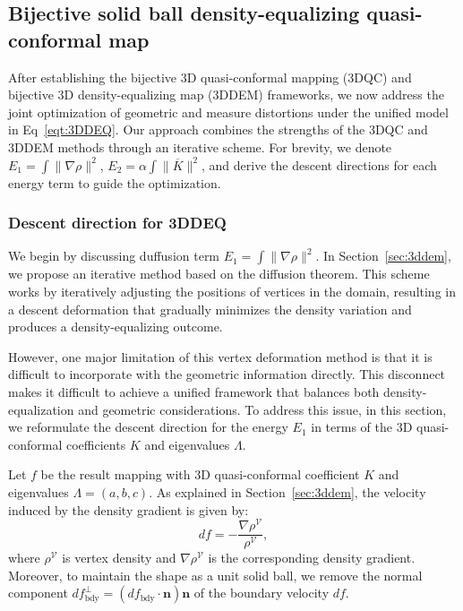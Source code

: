 \documentclass{article}
\begin{document}
\subsection{Bijective solid ball density-equalizing quasi-conformal map}
After establishing the bijective 3D quasi-conformal mapping (3DQC) and bijective 3D density-equalizing map (3DDEM) frameworks, we now address the joint optimization of geometric and measure distortions under the unified model in Eq~\eqref{eqt:3DDEQ}. Our approach combines the strengths of the 3DQC and 3DDEM methods through an iterative scheme. For brevity, we denote $E_1 = \int \|\nabla \rho \|^2$, $E_2 = \alpha \int \|\overline{K} \|^2$, and derive the descent directions for each energy term to guide the optimization.

\subsubsection{Descent direction for 3DDEQ}
We begin by discussing duffusion term $E_1 = \int \|\nabla \rho \|^2$. In Section~\ref{sec:3ddem}, we propose an iterative method based on the diffusion theorem. This scheme works by iteratively adjusting the positions of vertices in the domain, resulting in a descent deformation that gradually minimizes the density variation and produces a density-equalizing outcome.

However, one major limitation of this vertex deformation method is that it is difficult to incorporate with the geometric information directly. This disconnect makes it difficult to achieve a unified framework that balances both density-equalization and geometric considerations. To address this issue, in this section, we reformulate the descent direction for the energy $E_1$ in terms of the 3D quasi-conformal coefficients $K$ and eigenvalues $\Lambda$.


Let $f$ be the result mapping with 3D quasi-conformal coefficient $K$  and eigenvalues $\Lambda = (a,b,c)$. As explained in Section~\ref{sec:3ddem}, the velocity induced by the density gradient is given by:
\begin{equation}
    df = - \frac{\nabla \rho^{\mathcal{V}}}{\rho^{\mathcal{V}}},
\end{equation}
where $\rho^{\mathcal{V}}$ is vertex density and $\nabla \rho^{\mathcal{V}}$ is the corresponding density gradient. Moreover, to maintain the shape as a unit solid ball, we remove the normal component $df^{\bot}_{\text{bdy}} = \left(df_{\text{bdy}}\cdot \mathbf{n}\right)\mathbf{n}$ of the boundary velocity $df$.
\end{document}
